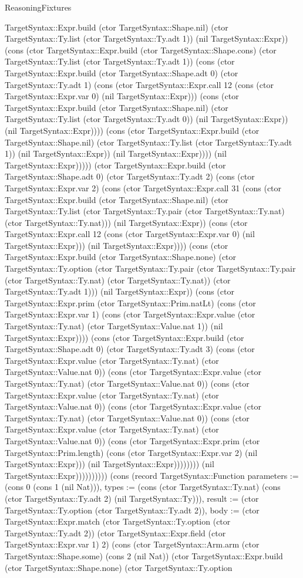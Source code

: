 \begin{lexlean}{ReasoningFixtures}
\begin{semanticmodule}
{TargetSyntax::Expr.build (ctor TargetSyntax::Shape.nil) (ctor TargetSyntax::Ty.list (ctor TargetSyntax::Ty.adt 1)) (nil TargetSyntax::Expr)) (cons (ctor TargetSyntax::Expr.build (ctor TargetSyntax::Shape.cons) (ctor TargetSyntax::Ty.list (ctor TargetSyntax::Ty.adt 1)) (cons (ctor TargetSyntax::Expr.build (ctor TargetSyntax::Shape.adt 0) (ctor TargetSyntax::Ty.adt 1) (cons (ctor TargetSyntax::Expr.call 12 (cons (ctor TargetSyntax::Expr.var 0) (nil TargetSyntax::Expr))) (cons (ctor TargetSyntax::Expr.build (ctor TargetSyntax::Shape.nil) (ctor TargetSyntax::Ty.list (ctor TargetSyntax::Ty.adt 0)) (nil TargetSyntax::Expr)) (nil TargetSyntax::Expr)))) (cons (ctor TargetSyntax::Expr.build (ctor TargetSyntax::Shape.nil) (ctor TargetSyntax::Ty.list (ctor TargetSyntax::Ty.adt 1)) (nil TargetSyntax::Expr)) (nil TargetSyntax::Expr)))) (nil TargetSyntax::Expr))))) (ctor TargetSyntax::Expr.build (ctor TargetSyntax::Shape.adt 0) (ctor TargetSyntax::Ty.adt 2) (cons (ctor TargetSyntax::Expr.var 2) (cons (ctor TargetSyntax::Expr.call 31 (cons (ctor TargetSyntax::Expr.build (ctor TargetSyntax::Shape.nil) (ctor TargetSyntax::Ty.list (ctor TargetSyntax::Ty.pair (ctor TargetSyntax::Ty.nat) (ctor TargetSyntax::Ty.nat))) (nil TargetSyntax::Expr)) (cons (ctor TargetSyntax::Expr.call 12 (cons (ctor TargetSyntax::Expr.var 0) (nil TargetSyntax::Expr))) (nil TargetSyntax::Expr)))) (cons (ctor TargetSyntax::Expr.build (ctor TargetSyntax::Shape.none) (ctor TargetSyntax::Ty.option (ctor TargetSyntax::Ty.pair (ctor TargetSyntax::Ty.pair (ctor TargetSyntax::Ty.nat) (ctor TargetSyntax::Ty.nat)) (ctor TargetSyntax::Ty.adt 1))) (nil TargetSyntax::Expr)) (cons (ctor TargetSyntax::Expr.prim (ctor TargetSyntax::Prim.natLt) (cons (ctor TargetSyntax::Expr.var 1) (cons (ctor TargetSyntax::Expr.value (ctor TargetSyntax::Ty.nat) (ctor TargetSyntax::Value.nat 1)) (nil TargetSyntax::Expr)))) (cons (ctor TargetSyntax::Expr.build (ctor TargetSyntax::Shape.adt 0) (ctor TargetSyntax::Ty.adt 3) (cons (ctor TargetSyntax::Expr.value (ctor TargetSyntax::Ty.nat) (ctor TargetSyntax::Value.nat 0)) (cons (ctor TargetSyntax::Expr.value (ctor TargetSyntax::Ty.nat) (ctor TargetSyntax::Value.nat 0)) (cons (ctor TargetSyntax::Expr.value (ctor TargetSyntax::Ty.nat) (ctor TargetSyntax::Value.nat 0)) (cons (ctor TargetSyntax::Expr.value (ctor TargetSyntax::Ty.nat) (ctor TargetSyntax::Value.nat 0)) (cons (ctor TargetSyntax::Expr.value (ctor TargetSyntax::Ty.nat) (ctor TargetSyntax::Value.nat 0)) (cons (ctor TargetSyntax::Expr.prim (ctor TargetSyntax::Prim.length) (cons (ctor TargetSyntax::Expr.var 2) (nil TargetSyntax::Expr))) (nil TargetSyntax::Expr)))))))) (nil TargetSyntax::Expr)))))))))}) (cons (record TargetSyntax::Function {parameters := (cons 0 (cons 1 (nil Nat))), types := (cons (ctor TargetSyntax::Ty.nat) (cons (ctor TargetSyntax::Ty.adt 2) (nil TargetSyntax::Ty))), result := (ctor TargetSyntax::Ty.option (ctor TargetSyntax::Ty.adt 2)), body := (ctor TargetSyntax::Expr.match (ctor TargetSyntax::Ty.option (ctor TargetSyntax::Ty.adt 2)) (ctor TargetSyntax::Expr.field (ctor TargetSyntax::Expr.var 1) 2) (cons (ctor TargetSyntax::Arm.arm (ctor TargetSyntax::Shape.some) (cons 2 (nil Nat)) (ctor TargetSyntax::Expr.build (ctor TargetSyntax::Shape.none) (ctor TargetSyntax::Ty.option }
\end{semanticmodule}
\end{lexlean}
